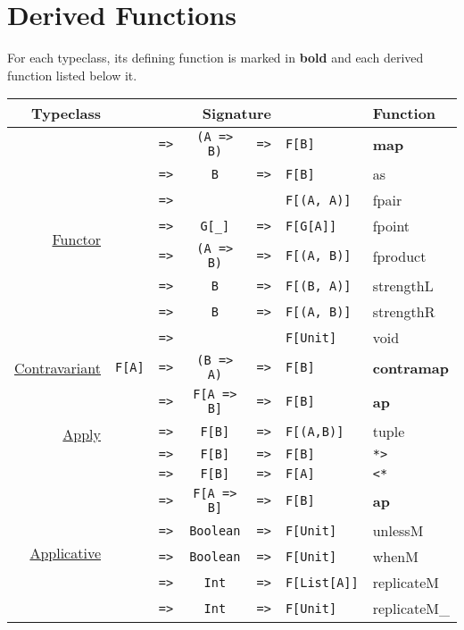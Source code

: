 \documentclass{tufte-handout}
\newcommand{\fa}{F[A]}
\newcommand{\fb}{F[B]}
\newcommand{\rarr}{\texttt{=>}}
\newcommand{\fTwo}[2]{\texttt{#1} & \rarr & & & \texttt{#2}}
\newcommand{\fThree}[3]{\texttt{#1} & \rarr & \texttt{#2} & \rarr & \texttt{#3}}
\newcommand{\sdocUrl}[1]{http://docs.typelevel.org/api/scalaz/stable/7.0.4/doc/\#scalaz.#1}
\newcommand{\sdocHref}[1]{\href{\sdocUrl{#1}}{#1}}
\begin{document}

\newpage

\section{Derived Functions}

For each typeclass, its defining function is marked in \textbf{bold} and each derived function listed below it.

\begin{table}[ht]
  \centering
  \selectfont
  \begin{tabular}{rrcclll}
    Typeclass & \multicolumn{5}{c}{Signature} & Function \\
    \midrule
    \multirow{8}{*}{\sdocHref{Functor}}
      & \fThree{\multirow{8}{*}{\fa}}{(A => B)}{\fb} & \textbf{map} \\
      & \fThree{}{B}{\fb} & as \\
      & \fTwo{}{F[(A, A)]} & fpair \\
      & \fThree{}{G[\_]}{F[G[A]]} & fpoint \\
      & \fThree{}{(A => B)}{F[(A, B)]} & fproduct \\
      & \fThree{}{B}{F[(B, A)]} & strengthL \\
      & \fThree{}{B}{F[(A, B)]} & strengthR \\
      & \fTwo{}{F[Unit]} & void \\[.5cm]
    \sdocHref{Contravariant} & \fThree{\fa}{(B => A)}{\fb} & \textbf{contramap} \\[.5cm]
    \multirow{4}{*}{\sdocHref{Apply}\footnotemark[3]}
      & \fThree{\multirow{4}{*}{\fa}}{F[A => B]}{\fb} & \textbf{ap} \\
      & \fThree{}{\fb}{F[(A,B)]} & tuple \\
      & \fThree{}{\fb}{\fb} & \verb$*>$ \\
      & \fThree{}{\fb}{\fa} & \verb$<*$ \\[.5cm]
    \multirow{5}{*}{\sdocHref{Applicative}}
      & \fThree{\multirow{5}{*}{\fa}}{F[A => B]}{\fb} & \textbf{ap} \\
      & \fThree{}{Boolean}{F[Unit]} & unlessM \\
      & \fThree{}{Boolean}{F[Unit]} & whenM \\
      & \fThree{}{Int}{F[List[A]]} & replicateM \\
      & \fThree{}{Int}{F[Unit]} & replicateM\_ \\[.5cm]

\end{tabular}
\end{table}
\end{document}
